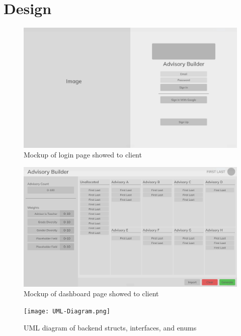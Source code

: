 \documentclass{paper}
\begin{document}
\section{Design}
\label{sec:design}
\begin{figure}
  \includegraphics[width=\linewidth]{Login-Mockup}
  \caption{Mockup of login page showed to client}
  \label{design:login}
\end{figure}
\begin{figure}
  \includegraphics[width=\linewidth]{Dashboard-Mockup}
  \caption{Mockup of dashboard page showed to client}
  \label{design:dashboard}
\end{figure}
\begin{figure}
  \texttt{[image: UML-Diagram.png]}
  \caption{UML diagram of backend structs, interfaces, and enums}
  \label{design:uml}
\end{figure}
\end{document}

